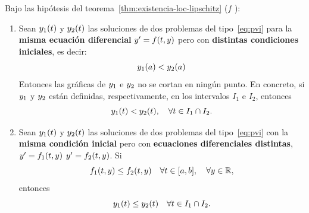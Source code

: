 \begin{proposition}
\label{pro:propiedades-pvi}
  Bajo las hipótesis del teorema~\ref{thm:existencia-loc-lipschitz}
  ($f$ \locLipschitz):
  \begin{enumerate}
  \item Sean $\sol_1(\tt)$ y $\sol_2(\tt)$ las soluciones de dos
    problemas del tipo~\eqref{eq:pvi} para la \textbf{misma ecuación
    diferencial} $y'=f(\tt,y)$ pero con \textbf{distintas condiciones
    iniciales}, es decir:
    $$\sol_1(\ta)<\sol_2(\ta)$$ 
    Entonces las gráficas de $\sol_1$ e $\sol_2$ no se cortan en
    ningún punto. En concreto, si $\sol_1$ y $\sol_2$ están
    definidas, respectivamente, en los intervalos $I_1$ e $I_2$,
    entonces
    \begin{equation*}
      \sol_1(\tt) < \sol_2(\tt), \quad \forall \tt \in I_1
      \cap I_2.
    \end{equation*}
    
  \item Sean $\sol_1(\tt)$ y $\sol_2(\tt)$ las soluciones de dos
    problemas del tipo~\eqref{eq:pvi} con la \textbf{misma condición
      inicial} pero con \textbf{ecuaciones diferenciales distintas},
    $y'=f_1(\tt,y)$ $y'=f_2(\tt,y)$. Si
    $$
    f_1(\tt,y) \le f_2(\tt,y) \quad \forall \tt\in[\ta,\tb], \quad
    \forall y\in\Rset,
    $$
    entonces
    $$
    \sol_1(\tt)\le \sol_2(\tt) \quad \forall \tt \in
    I_1 \cap I_2.
    $$
  \end{enumerate}
\end{proposition}

